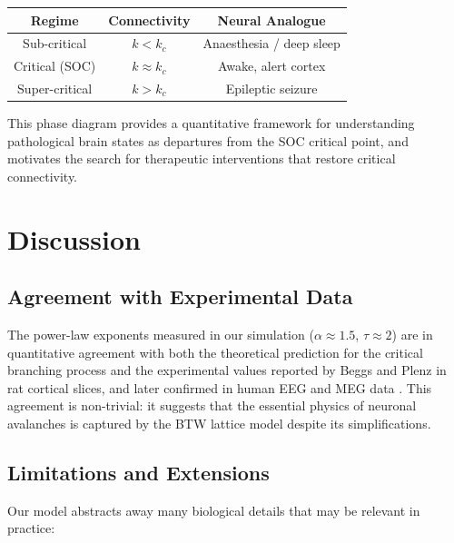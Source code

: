 \documentclass[12pt,a4paper]{article}
\begin{document}
\begin{center}
  \begin{tabular}{ccc}
    \toprule
    Regime & Connectivity & Neural Analogue \\
    \midrule
    Sub-critical   & $k < k_c$ & Anaesthesia / deep sleep \\
    Critical (SOC) & $k \approx k_c$ & Awake, alert cortex \\
    Super-critical & $k > k_c$ & Epileptic seizure \\
    \bottomrule
  \end{tabular}
\end{center}

This phase diagram provides a quantitative framework for understanding
pathological brain states as departures from the SOC critical point,
and motivates the search for therapeutic interventions that restore
critical connectivity.

\section{Discussion}
\label{sec:discussion}

\subsection{Agreement with Experimental Data}

The power-law exponents measured in our simulation ($\alpha \approx
1.5$, $\tau \approx 2$) are in quantitative agreement with both the
theoretical prediction for the critical branching process and the
experimental values reported by Beggs and Plenz \cite{beggs2003} in
rat cortical slices, and later confirmed in human EEG
\cite{linkenkaer2001} and MEG data \cite{palva2013}.  This agreement is
non-trivial: it suggests that the essential physics of neuronal
avalanches is captured by the BTW lattice model despite its
simplifications.

\subsection{Limitations and Extensions}

Our model abstracts away many biological details that may be relevant
in practice:
\end{document}
